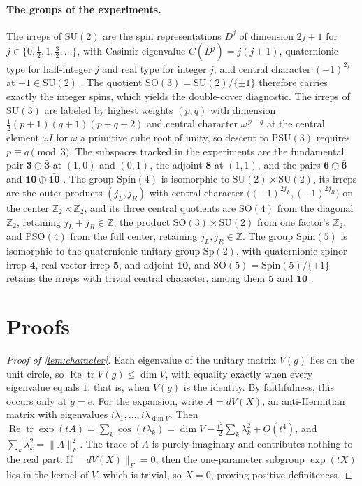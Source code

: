 \documentclass{article}
\newcommand{\SU}{\mathrm{SU}}
\newcommand{\SO}{\mathrm{SO}}
\newcommand{\PSU}{\mathrm{PSU}}
\newcommand{\Spin}{\mathrm{Spin}}
\newcommand{\PSO}{\mathrm{PSO}}
\newcommand{\Sp}{\mathrm{Sp}}
\newcommand{\Z}{\mathbb{Z}}
\begin{document}
\paragraph{The groups of the experiments.}
The irreps of $\SU(2)$ are the spin representations $D^j$ of dimension
$2j+1$ for $j \in \{0, \tfrac12, 1, \tfrac32, \dots\}$, with Casimir
eigenvalue $C(D^j) = j(j+1)$, quaternionic type for half-integer $j$
and real type for integer $j$, and central character $(-1)^{2j}$ at
$-1 \in \SU(2)$ \cite[Ch.~II]{brocker1985}. The quotient
$\SO(3) = \SU(2)/\{\pm 1\}$ therefore carries exactly the integer
spins, which yields the double-cover diagnostic. The irreps of $\SU(3)$
are labeled by highest weights $(p, q)$ with dimension
$\tfrac12 (p+1)(q+1)(p+q+2)$ and central character $\omega^{\,p-q}$ at
the central element $\omega I$ for $\omega$ a primitive cube root of
unity, so descent to $\PSU(3)$ requires $p \equiv q \pmod 3$. The
subspaces tracked in the experiments are the fundamental pair
$\mathbf{3} \oplus \bar{\mathbf{3}}$ at $(1,0)$ and $(0,1)$, the
adjoint $\mathbf{8}$ at $(1,1)$, and the pairs
$\mathbf{6} \oplus \bar{\mathbf{6}}$ and
$\mathbf{10} \oplus \bar{\mathbf{10}}$ \cite[Ch.~13]{fulton1991}. The
group $\Spin(4)$ is isomorphic to $\SU(2) \times \SU(2)$, its irreps
are the outer products $(j_L, j_R)$ with central character
$\bigl((-1)^{2j_L}, (-1)^{2j_R}\bigr)$ on the center
$\Z_2 \times \Z_2$, and its three central quotients are $\SO(4)$ from
the diagonal $\Z_2$, retaining $j_L + j_R \in \Z$, the product
$\SO(3) \times \SU(2)$ from one factor's $\Z_2$, and $\PSO(4)$ from the
full center, retaining $j_L, j_R \in \Z$. The group $\Spin(5)$ is
isomorphic to the quaternionic unitary group $\Sp(2)$, with
quaternionic spinor irrep $\mathbf{4}$, real vector irrep $\mathbf{5}$,
and adjoint $\mathbf{10}$, and $\SO(5) = \Spin(5)/\{\pm 1\}$ retains
the irreps with trivial central character, among them $\mathbf{5}$ and
$\mathbf{10}$ \cite[Ch.~16]{fulton1991}.

\section{Proofs}
\label{app:proofs}

\begin{proof}[Proof of \cref{lem:character}]
Each eigenvalue of the unitary matrix $V(g)$ lies on the unit circle,
so $\operatorname{Re}\operatorname{tr} V(g) \leq \dim V$, with equality
exactly when every eigenvalue equals $1$, that is, when $V(g)$ is the
identity. By faithfulness, this occurs only at $g = e$. For the
expansion, write $A = dV(X)$, an anti-Hermitian matrix with eigenvalues
$i\lambda_1, \dots, i\lambda_{\dim V}$. Then
$\operatorname{Re}\operatorname{tr}\exp(tA) = \sum_k \cos(t\lambda_k)
= \dim V - \tfrac{t^2}{2}\sum_k \lambda_k^2 + O(t^4)$, and
$\sum_k \lambda_k^2 = \lVert A\rVert_F^2$. The trace of $A$ is purely
imaginary and contributes nothing to the real part. If
$\lVert dV(X)\rVert_F = 0$, then the one-parameter subgroup $\exp(tX)$
lies in the kernel of $V$, which is trivial, so $X = 0$, proving
positive definiteness.
\end{proof}
\end{document}
